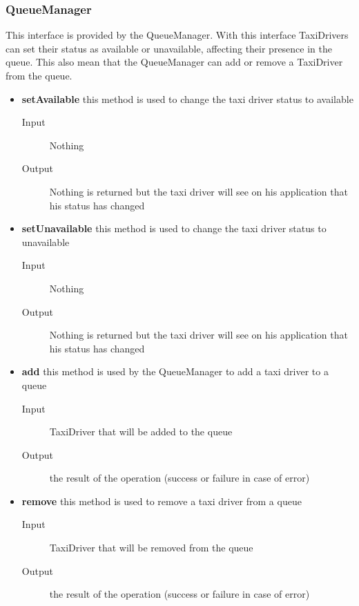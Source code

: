 		\subsubsection{QueueManager} 
		This interface is provided by the QueueManager. With this interface TaxiDrivers can set their status as available or unavailable, affecting their presence in the queue. This also mean that the QueueManager can add or remove a TaxiDriver from the queue.
		\begin{itemize}
			\item \textbf{setAvailable} this method is used to change the taxi driver status to available
			\begin{description}
				\item[Input] Nothing
				\item[Output] Nothing is returned but the taxi driver will see on his application that his status has changed
			\end{description}
			\item \textbf{setUnavailable} this method is used to change the taxi driver status to unavailable
			\begin{description}
				\item[Input] Nothing
				\item[Output] Nothing is returned but the taxi driver will see on his application that his status has changed
			\end{description}
			\item \textbf{add} this method is used by the QueueManager to add a taxi driver to a queue
			\begin{description}
				\item[Input] TaxiDriver that will be added to the queue
				\item[Output] the result of the operation (success or failure in case of error)
			\end{description}
			\item \textbf{remove} this method is used to remove a taxi driver from a queue
			\begin{description}
				\item[Input] TaxiDriver that will be removed from the queue
				\item[Output] the result of the operation (success or failure in case of error)
			\end{description}
		\end{itemize}
